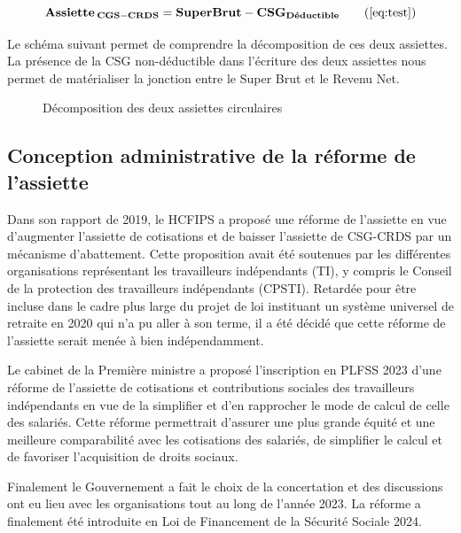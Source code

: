 \begin{equation}
\mathbf{
Assiette_{\: CGS-CRDS} = SuperBrut - CSG_{D\Acute{e}ductible} \tag{\ref{eq:test}}
}
\end{equation}

\vspace{0.2cm}

Le schéma suivant permet de comprendre la décomposition de ces deux assiettes. La présence de la CSG non-déductible  dans l'écriture des deux assiettes nous permet de matérialiser la jonction entre le Super Brut et le Revenu Net. 

\begin{figure}[!h]
    \center
    
    \caption{Décomposition des deux assiettes circulaires}
\end{figure}



\subsection{Conception administrative de la réforme de l'assiette}

Dans son rapport de 2019, le HCFIPS a proposé une réforme de l'assiette en vue d'augmenter l'assiette de cotisations et de baisser l'assiette de CSG-CRDS par un mécanisme d'abattement.
Cette proposition avait été soutenues par les  différentes organisations représentant les travailleurs indépendants (TI), y compris le Conseil de la protection des travailleurs indépendants (CPSTI). Retardée pour être incluse dans le cadre plus large du projet de loi instituant un système universel de retraite en 2020 qui n’a pu aller à son terme, il a été décidé que cette réforme de l’assiette serait menée à bien indépendamment. 

Le cabinet de la Première ministre a  proposé l’inscription en PLFSS 2023 d’une réforme de l’assiette de cotisations et contributions sociales des travailleurs indépendants en vue de la simplifier et d’en rapprocher le mode de calcul de celle des salariés. Cette réforme permettrait d’assurer une plus grande équité et une meilleure comparabilité avec les cotisations des salariés, de simplifier le calcul et de favoriser l’acquisition de droits sociaux.

Finalement le Gouvernement a fait le choix de la concertation et des discussions ont eu lieu avec les organisations tout au long de l'année 2023. La réforme a finalement été introduite en Loi de Financement de la Sécurité Sociale 2024. 

